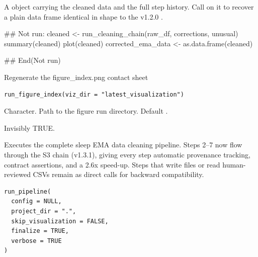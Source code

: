 \documentclass[a4paper]{book}
\begin{document}
%
\begin{Value}
A  object carrying the cleaned data and the full
step history. Call  on it to recover a plain data
frame identical in shape to the v1.2.0 .
\end{Value}
%
\begin{Examples}
\begin{ExampleCode}
## Not run: 
cleaned <- run_cleaning_chain(raw_df, corrections, unusual)
summary(cleaned)
plot(cleaned)
corrected_ema_data <- as.data.frame(cleaned)

## End(Not run)
\end{ExampleCode}
\end{Examples}
%
\begin{Description}
Regenerate the figure\_index.png contact sheet
\end{Description}
%
\begin{Usage}
\begin{verbatim}
run_figure_index(viz_dir = "latest_visualization")
\end{verbatim}
\end{Usage}
%
\begin{Arguments}
\begin{ldescription}
\item[\code{viz\_dir}] Character. Path to the figure run directory. Default
.
\end{ldescription}
\end{Arguments}
%
\begin{Value}
Invisibly TRUE.
\end{Value}
%
\begin{Description}
Executes the complete sleep EMA data cleaning pipeline.
Steps 2--7 now flow through the S3 chain (v1.3.1), giving every step
automatic provenance tracking, contract assertions, and a 2.6x speed-up.
Steps that write files or read human-reviewed CSVs remain as direct
 calls for backward compatibility.
\end{Description}
%
\begin{Usage}
\begin{verbatim}
run_pipeline(
  config = NULL,
  project_dir = ".",
  skip_visualization = FALSE,
  finalize = TRUE,
  verbose = TRUE
)
\end{verbatim}
\end{Usage}
\end{document}
